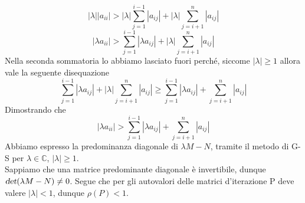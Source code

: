 \documentclass[10pt]{book}
\begin{document}
$$|\lambda||a_{ii}| > |\lambda|\sum_{j=1}^{i-1} |a_{ij}| + |\lambda|\sum_{j=i+1}^{n} |a_{ij}|$$
$$|\lambda a_{ii}| > \sum_{j=1}^{i-1} |\lambda a_{ij}| + |\lambda|\sum_{j=i+1}^{n} |a_{ij}|$$
Nella seconda sommatoria lo abbiamo lasciato fuori perché, siccome $|\lambda| \geq 1$ allora vale la seguente disequazione
$$\sum_{j=1}^{i-1} |\lambda a_{ij}| + |\lambda|\sum_{j=i+1}^{n} |a_{ij}| \geq \sum_{j=1}^{i-1} |\lambda a_{ij}| + \sum_{j=i+1}^{n} |a_{ij}|$$
Dimostrando che 
$$|\lambda a_{ii}| > \sum_{j=1}^{i-1} |\lambda a_{ij}| + \sum_{j=i+1}^{n} |a_{ij}|$$
Abbiamo espresso la predominanza diagonale di $\lambda M - N$, tramite il metodo di G-S per $\lambda\in\mathbb{C}$, $|\lambda| \geq 1$.\\
Sappiamo che una matrice predominante diagonale è invertibile, dunque $\textsl{det}(\lambda M - N) \neq 0$. Segue che per gli autovalori delle matrici d'iterazione P deve valere $|\lambda| < 1$, dunque $\rho(P) < 1$.
\end{document}
